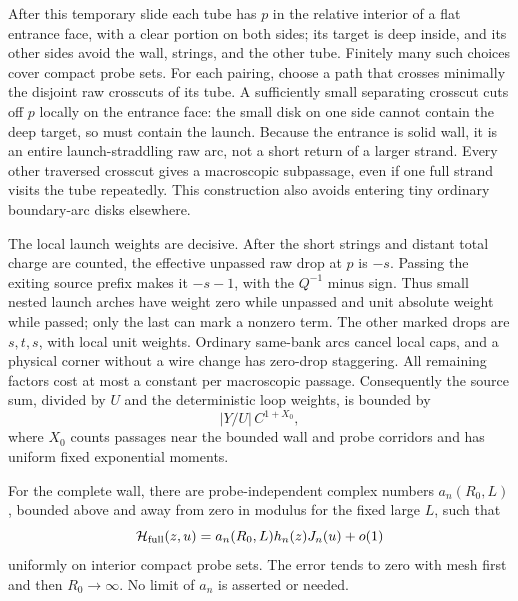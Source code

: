 After this temporary slide each tube has $p$ in the relative interior
of a flat entrance face, with a clear portion on both sides; its target
is deep inside, and its other sides avoid the wall, strings, and the
other tube.  Finitely many such choices cover compact probe sets.
For each pairing, choose a path that crosses minimally the disjoint
raw crosscuts of its tube.  A sufficiently small separating crosscut
cuts off $p$ locally on the entrance face: the small disk on one side
cannot contain the deep target, so must contain the launch.  Because
the entrance is solid wall, it is an entire launch-straddling raw arc,
not a short return of a larger strand.  Every other traversed crosscut
gives a macroscopic subpassage, even if one full strand visits the tube
repeatedly.  This construction also avoids entering tiny ordinary
boundary-arc disks elsewhere.

The local launch weights are decisive.  After the short strings and
distant total charge are counted, the effective unpassed raw drop at
$p$ is $-s$.  Passing the exiting source prefix makes it $-s-1$, with
the $Q^{-1}$ minus sign.  Thus small nested launch arches have weight
zero while unpassed and unit absolute weight while passed; only the
last can mark a nonzero term.  The other marked drops are $s,t,s$,
with local unit weights.  Ordinary same-bank arcs cancel local caps,
and a physical corner without a wire change has zero-drop staggering.
All remaining factors cost at most a constant per macroscopic passage.
Consequently the source sum, divided by $U$ and the deterministic loop
weights, is bounded by
\begin{equation}
 |Y/U|\,C^{1+X_0},
 \label{wall:absolute-source}
\end{equation}
where $X_0$ counts passages near the bounded wall and probe corridors
and has uniform fixed exponential moments.

\begin{proposition}
\label{wall:factorization}
For the complete wall, there are probe-independent complex numbers
$a_n(R_0,L)$, bounded above and away from zero in modulus for the fixed
large $L$, such that
\begin{equation}
 \mathcal H_{\rm full}(z,u)
       =a_n(R_0,L)h_n(z)J_n(u)+o(1)
 \label{wall:factorization-eq}
\end{equation}
uniformly on interior compact probe sets.  The error tends to zero
with mesh first and then $R_0\to\infty$.  No limit of $a_n$ is asserted
or needed.
\end{proposition}

